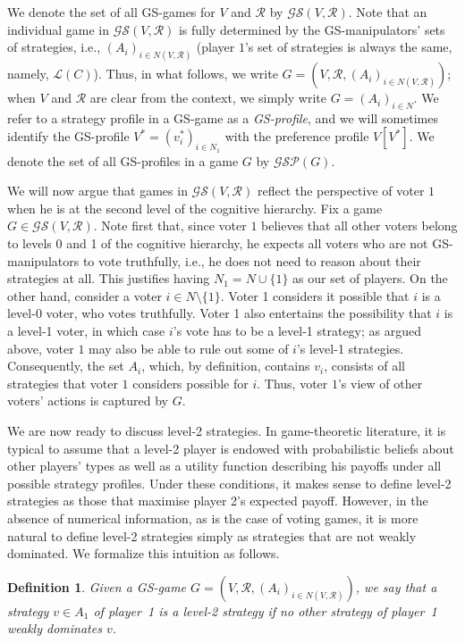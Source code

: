 \documentclass[11pt]{article}
\newtheorem{definition}{Definition}
\newcommand{\calR}{\mathcal{R}}
\newcommand{\calL}{\mathcal{L}}
\newcommand{\GS}{\mathcal{GS}}
\newcommand{\GSP}{\mathcal{GSP}}
\begin{document}
We denote the set of all GS-games for $V$ and $\calR$ by $\GS(V, \calR)$.
Note that an individual game in $\GS(V, \calR)$ is fully determined by the 
GS-manipulators' sets of strategies, i.e.,
$(A_i)_{i\in N(V, \calR)}$ (player $1$'s set of strategies is always the same, namely, $\calL(C)$). 
Thus, in what follows, we write $G=(V, \calR, (A_i)_{i\in N(V, \calR)})$;
when $V$ and $\calR$ are clear from the context, we simply write $G = (A_i)_{i\in N}$.
We refer to a strategy profile in a GS-game as a {\em GS-profile},
and we will sometimes identify the GS-profile $V^* = (v^*_i)_{i\in N_1}$ with the preference profile
$V[V^*]$. We denote the set of all GS-profiles in a game $G$ by $\GSP(G)$. 

We will now argue that games in $\GS(V, \calR)$ reflect the perspective of voter $1$
when he is at the second level of the cognitive hierarchy. Fix a game $G\in\GS(V, \calR)$.
Note first that, since voter $1$ believes that all other voters belong
to levels 0 and 1 of the cognitive hierarchy, 
he expects all voters who are not GS-manipulators to vote truthfully, i.e., he does
not need to reason about their strategies at all. This justifies having $N_1 = N\cup\{1\}$ as our set of players.
On the other hand, consider a voter $i\in N\setminus\{1\}$. Voter 1 considers it possible
that $i$ is a level-0 voter, who votes truthfully. Voter 1 also entertains
the possibility that $i$ is a level-1 voter, in which case $i$'s vote
has to be a level-1 strategy; as argued above, voter $1$ may also be able to rule
out some of $i$'s level-1 strategies. Consequently, the set $A_i$, which, by definition, contains
$v_i$, consists of all strategies that voter $1$ considers possible for $i$.
Thus, voter $1$'s view of other voters' actions is captured by $G$.

We are now ready to discuss level-2 strategies.
In game-theoretic literature, it is typical to assume that a level-2 player is endowed with probabilistic
beliefs about other players' types as well as a utility function describing his payoffs under all
possible strategy profiles. Under these conditions, it makes sense to define level-2 strategies
as those that maximise player 2's expected payoff. However, in the absence of numerical information, 
as is the case of voting games, it is more natural to define level-2 strategies simply as 
strategies that are not weakly dominated. We formalize this intuition as follows.

\begin{definition}
Given a GS-game $G=(V, \calR, (A_i)_{i\in N(V, \calR)})$, we say that a strategy $v\in A_1$ of player~1
is a {\em level-2 strategy} if no other strategy of player~1 weakly dominates $v$.
\end{definition}
\end{document}
